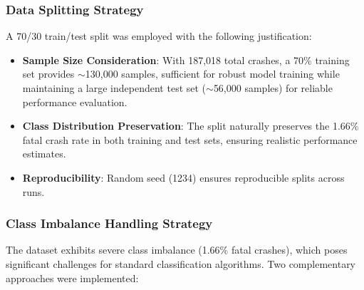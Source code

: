 \documentclass[12pt,a4paper]{article}
\begin{document}
\subsubsection{Data Splitting Strategy}
A 70/30 train/test split was employed with the following justification:
\begin{itemize}
    \item \textbf{Sample Size Consideration}: With 187,018 total crashes, a 70\% training set provides $\sim$130,000 samples, sufficient for robust model training while maintaining a large independent test set ($\sim$56,000 samples) for reliable performance evaluation.
    \item \textbf{Class Distribution Preservation}: The split naturally preserves the 1.66\% fatal crash rate in both training and test sets, ensuring realistic performance estimates.
    \item \textbf{Reproducibility}: Random seed (1234) ensures reproducible splits across runs.
\end{itemize}

\subsubsection{Class Imbalance Handling Strategy}
The dataset exhibits severe class imbalance (1.66\% fatal crashes), which poses significant challenges for standard classification algorithms. Two complementary approaches were implemented:
\end{document}
